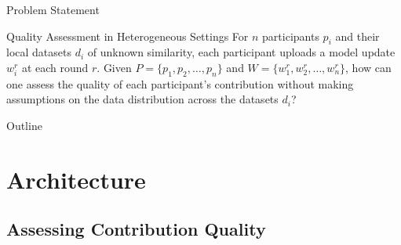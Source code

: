 \documentclass[aspectratio=169,10pt]{imta}
\begin{document}
\begin{frame}{Problem Statement}
  \begin{block}{Quality Assessment in Heterogeneous Settings}
    For $n$ participants $p_i$ and their local datasets $d_i$ of unknown similarity, each participant uploads a model update $w_i^r$ at each round $r$. Given $P = \{ p_1, p_2, \dots, p_n \} $ and $W = \{ w_1^r, w_2^r, \dots, w_n^r \} $, how can one assess the quality of each participant’s contribution without making assumptions on the data distribution across the datasets $d_i$?
  \end{block}
\end{frame}

\begin{frame}{Outline}
  \centering
  \begin{minipage}[t]{.8\textwidth}
    \tableofcontents%
  \end{minipage}
\end{frame}


\section{Architecture}

\subsection{Assessing Contribution Quality}
\end{document}
